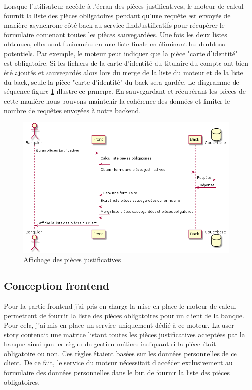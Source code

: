 	Lorsque l'utilisateur accède à l'écran des pièces justificatives, le moteur de calcul fournit la liste des pièces obligatoires pendant qu'une requête est envoyée de manière asynchrone côté back au service findJustificatifs pour récupérer le formulaire contenant toutes les pièces sauvegardées. Une fois les deux listes obtenues, elles sont fusionnées en une liste finale en éliminant les doublons potentiels. Par exemple, le moteur peut indiquer que la pièce "carte d'identité" est obligatoire. Si les fichiers de la carte d'identité du titulaire du compte ont bien été ajoutés et sauvegardés alors lors du merge de la liste du moteur et de la liste du back, seule la pièce "carte d'identité" du back sera gardée. Le diagramme de séquence figure \ref{seqGet} illustre ce principe. En sauvegardant et récupérant les pièces de cette manière nous pouvons maintenir la cohérence des données et limiter le nombre de requêtes envoyées à notre backend. \\

\begin{figure}[h!]
	\includegraphics[scale=0.55]{images/travailBP1818/piecesJustif/seqGet.png}
	\centering
	\caption{Affichage des pièces justificatives}
	\label{seqGet}
\end{figure}

\subsection{Conception frontend}
	
	Pour la partie frontend j'ai pris en charge la mise en place le moteur de calcul permettant de fournir la liste des pièces obligatoires pour un client de la banque. Pour cela, j'ai mis en place un service uniquement dédié à ce moteur. La user story contenait une matrice listant toutes les pièces justificatives acceptées par la banque ainsi que les règles de gestion métiers indiquant si la pièce était obligatoire ou non. Ces règles étaient basées sur les données personnelles de ce client. De ce fait, le service du moteur nécessitait d'accéder exclusivement au formulaire des données personnelles dans le but de fournir la liste des pièces obligatoires. \\
	
